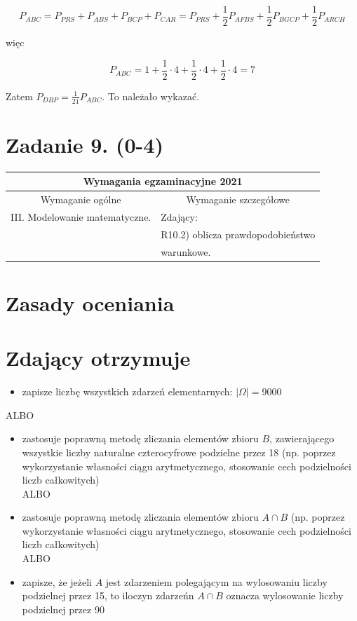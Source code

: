 \documentclass[10pt]{article}
\begin{document}
$$
P_{A B C}=P_{P R S}+P_{A B S}+P_{B C P}+P_{C A R}=P_{P R S}+\frac{1}{2} P_{A F B S}+\frac{1}{2} P_{B G C P}+\frac{1}{2} P_{A R C H}
$$

więc

$$
P_{A B C}=1+\frac{1}{2} \cdot 4+\frac{1}{2} \cdot 4+\frac{1}{2} \cdot 4=7
$$

Zatem $P_{D B P}=\frac{1}{21} P_{A B C}$. To należało wykazać.

\section*{Zadanie 9. (0-4)}
\begin{center}
\begin{tabular}{|l|l|}
\hline
\multicolumn{2}{|c|}{Wymagania egzaminacyjne 2021} \\
\hline
\multicolumn{1}{|c|}{Wymaganie ogólne} & \multicolumn{1}{c|}{Wymaganie szczegółowe} \\
\hline
III. Modelowanie matematyczne. & Zdający: \\
 & R10.2) oblicza prawdopodobieństwo \\
 & warunkowe. \\
\hline
\end{tabular}
\end{center}

\section*{Zasady oceniania}
\section*{Zdający otrzymuje}
\begin{itemize}
  \item zapisze liczbę wszystkich zdarzeń elementarnych: $|\Omega|=9000$
\end{itemize}

ALBO

\begin{itemize}
  \item zastosuje poprawną metodę zliczania elementów zbioru $B$, zawierającego wszystkie liczby naturalne czterocyfrowe podzielne przez 18 (np. poprzez wykorzystanie własności ciągu arytmetycznego, stosowanie cech podzielności liczb całkowitych)\\
ALBO
  \item zastosuje poprawną metodę zliczania elementów zbioru $A \cap B$ (np. poprzez wykorzystanie własności ciągu arytmetycznego, stosowanie cech podzielności liczb całkowitych)\\
ALBO
  \item zapisze, że jeżeli $A$ jest zdarzeniem polegającym na wylosowaniu liczby podzielnej przez 15, to iloczyn zdarzeńn $A \cap B$ oznacza wylosowanie liczby podzielnej przez 90
\end{itemize}
\end{document}
